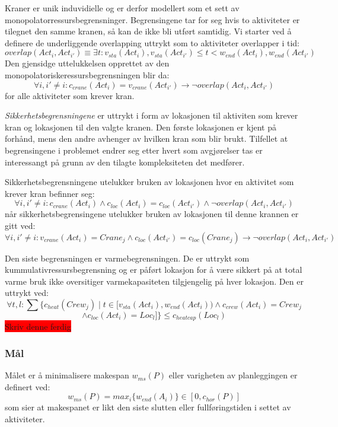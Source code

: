 Kraner er unik induvidielle og er derfor modellert som et sett av monopolatorressursbegrensninger. Begrensingene tar for seg hvis to aktiviteter er tilegnet den samme kranen, så kan de ikke bli utført samtidig. Vi starter ved å definere de underliggende overlapping uttrykt som to aktiviteter overlapper i tid: \[ overlap(Act_{i},Act_{i'}) \equiv \exists t : v_{sta}(Act_{i}),v_{sta}(Act_{i'}) \leq t < w_{end}(Act_{i}),w_{end}(Act_{i'}) \] Den gjensidge uttelukkelsen opprettet av den monopolatoriskeressursbegrensningen blir da: \[ \forall i,i' \neq i : c_{crane}(Act_{i}) = v_{crane}(Act_{i'}) \rightarrow \neg overlap(Act_{i},Act_{i'}) \] for alle aktiviteter som krever kran.

\textit{Sikkerhetsbegrensningene} er uttrykt i form av lokasjonen til aktiviten som krever kran og lokasjonen til den valgte kranen. Den første lokasjonen er kjent på forhånd, mens den andre avhenger av hvilken kran som blir brukt. Tilfellet at begrensingene i problemet endrer seg etter hvert som avgjørelser tas er interessangt på grunn av den tilagte kompleksiteten det medfører.

Sikkerhetsbegrensningene utelukker bruken av lokasjonen hvor en aktivitet som krever kran befinner seg: \[ \forall i,i' \neq i : c_{crane}(Act_{i}) \wedge c_{loc}(Act_{i}) = c_{loc}(Act_{i'}) \wedge \neg overlap(Act_{i},Act_{i'}) \] når sikkerhetsbegrensingene utelukker bruken av lokasjonen til denne krannen er gitt ved: \[ \forall i,i' \neq i : v_{crane}(Act_{i}) = Crane_{j} \wedge c_{loc}(Act_{i'}) = c_{loc}(Crane_{j}) \rightarrow \neg overlap(Act_{i},Act_{i'}) \]

Den siste begrensningen er varmebegrensningen. De er uttrykt som kummulativressursbegrensning og er påført lokasjon for å være sikkert på at total varme bruk ikke oversitiger varmekapasiteten tilgjengelig på hver lokasjon. Den er uttrykt ved: \[ \forall t,l: \sum\{c_{heat}(Crew_j) \mid t \in [ v_{sta}(Act_{i}), w_{end}(Act_{i})) \wedge c_{crew}(Act_{i}) = Crew_{j} \] \[ \wedge c_{loc}(Act_{i}) = Loc_{l} ] \} \le c_{heatcap}(Loc_{l}) \]
\colorbox{red}{Skriv denne ferdig}

\subsubsection{Mål}
Målet er å minimalisere makespan $ w_{ms}(P) $ eller varigheten av planleggingen er definert ved: \[ w_{ms}(P) = max_{i} \{ w_{end}(A_{i}) \} \in [0,c_{hor}(P)] \] som sier at makespanet er likt den siste slutten eller fullføringstiden i settet av aktiviteter.

